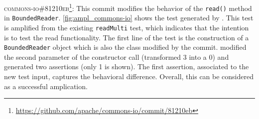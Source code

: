
\textsc{commons-io\#81210eb}\footnote{\url{https://github.com/apache/commons-io/commit/81210eb}}: This commit modifies the behavior of the \texttt{read()} method in \texttt{BoundedReader}.
\autoref{fig:ampl_commons-io} shows the test generated by \DCII.
This test is amplified from the existing \texttt{readMulti} test, which indicates that the intention is to test the read functionality.
The first line of the test is the construction of a \texttt{BoundedReader} object which is also the class modified by the commit.
\DCII modified the second parameter of the constructor call (transformed $3$ into a $0$) and generated two assertions (only 1 is shown).
The first assertion, associated to the new test input, captures the behavioral difference.
Overall, this can be considered as a successful amplication.

